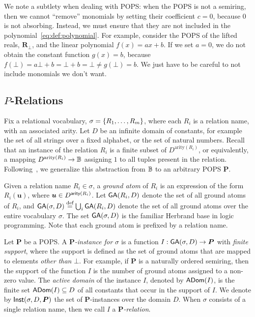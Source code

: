 We note a subtlety when dealing with POPS:
when the POPS is not a semiring, then we cannot ``remove'' monomials
by setting their coefficient $c=0$, because $0$ is not absorbing.
Instead, we must ensure that they are not included in the polynomial~\eqref{eq:def:polynomial}.
For example, consider the POPS of the lifted reals, $\bm R_\bot$, and
the linear polynomial $f(x) = ax + b$.  If we set $a = 0$, we do not
obtain the constant function $g(x)=b$, because
$f(\bot) = a\bot + b = \bot + b = \bot \neq g(\bot)=b$.  We just have
to be careful to not include monomials we don't want.

\subsection{\texorpdfstring{$P$-Relations}{P-Relations}}

\label{subsec:p:relations}

Fix a relational vocabulary, $\sigma = \{R_1, \ldots, R_m\}$, where
each $R_i$ is a relation name, with an associated arity.  Let $D$ be
an infinite domain of constants, for example the set of all strings
over a fixed alphabet, or the set of natural numbers.  Recall that an
instance of the relation $R_i$ is a finite subset of
$D^{\text{arity}(R_i)}$, or equivalently, a mapping
$D^{\text{arity}(R_i)} \rightarrow \mathbb B$ assigning $1$ to all tuples
present in the relation.  Following~\cite{DBLP:conf/pods/GreenKT07},
we generalize this abstraction from $\mathbb B$ to an arbitrary POPS $\bm P$.

Given a relation name $R_i \in \sigma$, a {\em ground atom} of $R_i$
is an expression of the form $R_i(\bm u)$, where
$\bm u \in D^{\textsf{arity}(R_i)}$.  Let $\textsf{GA}(R_i,D)$ denote the set of
all ground atoms of $R_i$, and
$\textsf{GA}(\sigma, D) \stackrel{\text{def}}{=} \bigcup_i \textsf{GA}(R_i,D)$ denote the set of
all ground atoms over the entire vocabulary $\sigma$.  The set
$\textsf{GA}(\sigma, D)$ is the familiar Herbrand base in logic
programming.  Note that each ground atom is prefixed by a relation
name.

Let $\bm P$ be a POPS.  A {\em $\bm P$-instance for $\sigma$} is a function
$I : \textsf{GA}(\sigma, D) \rightarrow \bm P$ with {\em finite support},
where the support is defined as the set of ground atoms that are
mapped to elements {\em other than} $\bot$.
For example, if $\bm P$ is a naturally ordered semiring, then the support of the function
$I$ is the number of ground atoms assigned to a non-zero value.
The {\em active domain} of the instance $I$,
denoted by $\textsf{ADom}(I)$, is the finite set $\textsf{ADom}(I) \subseteq D$ of all constants that occur
in the support of $I$.  We denote by $\textsf{Inst}(\sigma, D, \bm P)$ the set
of $\bm P$-instances over the domain $D$.  When $\sigma$ consists of a
single relation name, then we call $I$ a {\em $\bm P$-relation}.

